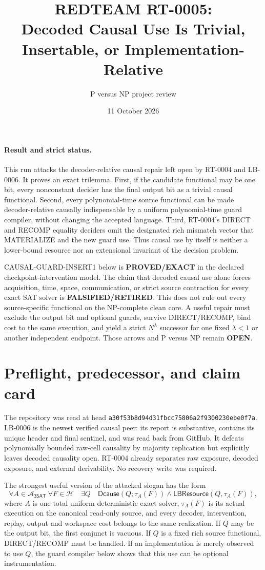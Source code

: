 \documentclass[11pt]{article}
\title{REDTEAM RT-0005:\\
Decoded Causal Use Is Trivial, Insertable, or Implementation-Relative}
\author{P versus NP project review}
\date{11 October 2026}
\newcommand{\SAT}{\mathsf{3SAT}}
\begin{document}
\maketitle

\paragraph{Result and strict status.}
This run attacks the decoder-relative causal repair left open by RT-0004 and
LB-0006.  It proves an exact trilemma.  First, if the candidate functional may
be one bit, every nonconstant decider has the final output bit as a trivial
causal functional.  Second, every polynomial-time source functional can be
made decoder-relative causally indispensable by a uniform polynomial-time
guard compiler, without changing the accepted language.  Third, RT-0004's
DIRECT and RECOMP equality deciders omit the designated rich mismatch vector
that MATERIALIZE and the new guard use.  Thus causal use by itself is neither
a lower-bound resource nor an extensional invariant of the decision problem.

\textsf{CAUSAL-GUARD-INSERT1} below is \textbf{PROVED/EXACT} in the declared
checkpoint-intervention model.  The claim that decoded causal use alone
forces acquisition, time, space, communication, or strict source contraction
for every exact SAT solver is \textbf{FALSIFIED/RETIRED}.  This does not rule
out every source-specific functional on the NP-complete clean core.  A useful
repair must exclude the output bit and optional guards, survive DIRECT/RECOMP,
bind cost to the same execution, and yield a strict $N^\lambda$ successor for
one fixed $\lambda<1$ or another independent endpoint.  Those arrows and P
versus NP remain \textbf{OPEN}.

\section{Preflight, predecessor, and claim card}
The repository was read at head
\texttt{a30f53b8d94d31fbcc75806a2f9300230ebe0f7a}.  LB-0006 is the newest
verified causal peer: its report is substantive, contains its unique header
and final sentinel, and was read back from GitHub.  It defeats polynomially
bounded raw-cell causality by majority replication but explicitly leaves
decoded causality open.  RT-0004 already separates raw exposure, decoded
exposure, and external derivability.  No recovery write was required.

The strongest useful version of the attacked slogan has the form
\[
 \forall A\in\mathcal A_{\SAT}\ \forall F\in\mathcal H\quad
 \exists Q\quad
 \mathsf{Dcause}(Q;\tau_A(F))\wedge
 \mathsf{LBResource}(Q,\tau_A(F)),                         \tag{1}
\]
where $A$ is one total uniform deterministic exact solver, $\tau_A(F)$ is its
actual execution on the canonical read-only source, and every decoder,
intervention, replay, output and workspace cost belongs to the same
realization.  If $Q$ may be the output bit, the first conjunct is vacuous.  If
$Q$ is a fixed rich source functional, DIRECT/RECOMP must be handled.  If an
implementation is merely observed to use $Q$, the guard compiler below shows
that this use can be optional instrumentation.
\end{document}
